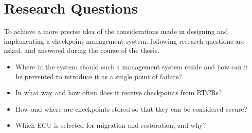 \section{Research Questions}\label{section:research_questions}
To achieve a more precise idea of the considerations made in designing and implementing a checkpoint management system, following research questions are asked, and answered during the course of the thesis.
\begin{itemize}
    \item Where in the system should such a management system reside and how can it be prevented to introduce it as a single point of failure?
    \item In what way and how often does it receive checkpoints from RTCRs?
    \item How and where are checkpoints stored so that they can be considered secure?
    \item Which ECU is selected for migration and restoration, and why?
\end{itemize}
